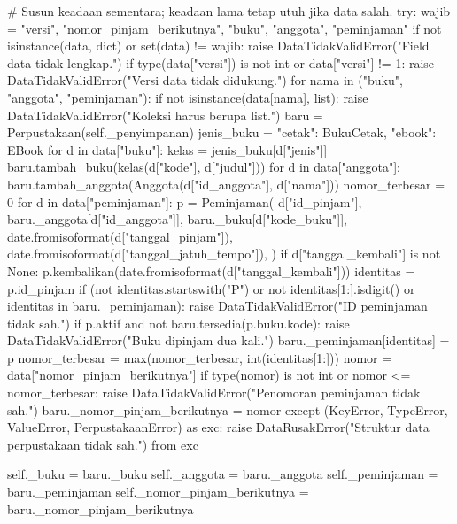 \begin{kode}
        # Susun keadaan sementara; keadaan lama tetap utuh jika data salah.
        try:
            wajib = {"versi", "nomor_pinjam_berikutnya", "buku",
                     "anggota", "peminjaman"}
            if not isinstance(data, dict) or set(data) != wajib:
                raise DataTidakValidError("Field data tidak lengkap.")
            if type(data["versi"]) is not int or data["versi"] != 1:
                raise DataTidakValidError("Versi data tidak didukung.")
            for nama in ("buku", "anggota", "peminjaman"):
                if not isinstance(data[nama], list):
                    raise DataTidakValidError("Koleksi harus berupa list.")
            baru = Perpustakaan(self._penyimpanan)
            jenis_buku = {"cetak": BukuCetak, "ebook": EBook}
            for d in data["buku"]:
                kelas = jenis_buku[d["jenis"]]
                baru.tambah_buku(kelas(d["kode"], d["judul"]))
            for d in data["anggota"]:
                baru.tambah_anggota(Anggota(d["id_anggota"], d["nama"]))
            nomor_terbesar = 0
            for d in data["peminjaman"]:
                p = Peminjaman(
                    d["id_pinjam"], baru._anggota[d["id_anggota"]],
                    baru._buku[d["kode_buku"]],
                    date.fromisoformat(d["tanggal_pinjam"]),
                    date.fromisoformat(d["tanggal_jatuh_tempo"]),
                )
                if d["tanggal_kembali"] is not None:
                    p.kembalikan(date.fromisoformat(d["tanggal_kembali"]))
                identitas = p.id_pinjam
                if (not identitas.startswith("P")
                        or not identitas[1:].isdigit()
                        or identitas in baru._peminjaman):
                    raise DataTidakValidError("ID peminjaman tidak sah.")
                if p.aktif and not baru.tersedia(p.buku.kode):
                    raise DataTidakValidError("Buku dipinjam dua kali.")
                baru._peminjaman[identitas] = p
                nomor_terbesar = max(nomor_terbesar, int(identitas[1:]))
            nomor = data["nomor_pinjam_berikutnya"]
            if type(nomor) is not int or nomor <= nomor_terbesar:
                raise DataTidakValidError("Penomoran peminjaman tidak sah.")
            baru._nomor_pinjam_berikutnya = nomor
        except (KeyError, TypeError, ValueError, PerpustakaanError) as exc:
            raise DataRusakError("Struktur data perpustakaan tidak sah.") from exc

        self._buku = baru._buku
        self._anggota = baru._anggota
        self._peminjaman = baru._peminjaman
        self._nomor_pinjam_berikutnya = baru._nomor_pinjam_berikutnya
\end{kode}

